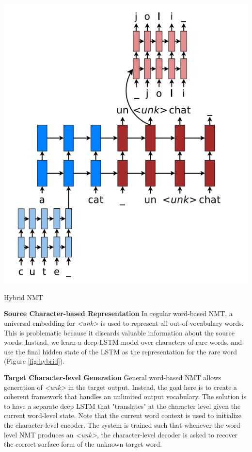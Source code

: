 \documentclass{tufte-handout}
\begin{document}
\begin{marginfigure}
	\centering
	\includegraphics[width=0.9\linewidth]{hybrid.png}
	\caption {Hybrid NMT}
	\label{fig:hybrid}
\end{marginfigure}

\textbf{Source Character-based Representation} In regular word-based NMT, a universal embedding for \textit{<unk>} is used to represent all out-of-vocabulary words. This is problematic because it discards valuable information about the source words. Instead, we learn a deep LSTM model over characters of rare words, and use the final hidden state of the LSTM as the representation for the rare word (Figure \ref{fig:hybrid}).

\textbf{Target Character-level Generation} General word-based NMT allows generation of \textit{<unk>} in the target output. Instead, the goal here is to create a coherent framework that handles an unlimited output vocabulary. The solution is to have a separate deep LSTM that "translates" at the character level given the current word-level state. Note that the current word context is used to initialize the character-level encoder. The system is trained such that whenever the word-level NMT produces an \textit{<unk>}, the character-level decoder is asked to recover the correct surface form of the unknown target word.

\end{document}
